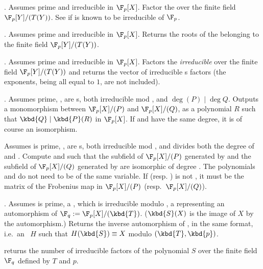 . Assumes  prime
and  irreducible in $\F_p[X]$. Factor the  
over the finite field $\F_p[Y]/(T(Y))$. See 
if  is known to be irreducible of $\F_p$.

. Assumes  prime
and  irreducible in $\F_p[X]$. Returns the roots of the 
 belonging to the finite field $\F_p[Y]/(T(Y))$.

. Assumes  prime
and  irreducible in $\F_p[X]$. Factors the \emph{irreducible}
  over the finite field $\F_p[Y]/(T(Y))$ and returns the
vector of irreducible s factors (the exponents, being all equal to
$1$, are not included).

. Assumes  prime,
,  are s, both irreducible mod , and
$\deg(P) \mid \deg Q$. Outputs a monomorphism between $\F_p[X]/(P)$ and
$\F_p[X]/(Q)$, as a polynomial $R$ such that $\kbd{Q} \mid \kbd{P}(R)$ in
$\F_p[X]$. If  and  have the same degree, it is of course an
isomorphism.

\hfil\break
Assumes  is prime, ,  are s, both
irreducible mod , and  divides both the degree of  and
. Compute  and  such that the subfield of
$\F_p[X]/(P)$ generated by  and the subfield of $\F_p[X]/(Q)$
generated by  are isomorphic of degree . The polynomials
 and  do not need to be of the same variable. If 
(resp. ) is not , it must be the matrix of the Frobenius
map in $\F_p[X]/(P)$ (resp.~$\F_p[X]/(Q)$).

. Assumes  is prime,
 a , which is irreducible modulo ,  a
 representing an automorphism of $\F_q := \F_p[X]/(\kbd{T})$.
($\kbd{S}(X)$ is the image of $X$ by the automorphism.) Returns the
inverse automorphism of , in the same format, i.e.~an ~$H$
such that $H(\kbd{S}) \equiv X$ modulo $(\kbd{T}, \kbd{p})$.

 returns the number of
irreducible factors of the polynomial $S$ over the finite field $\F_q$
defined by $T$ and $p$.

